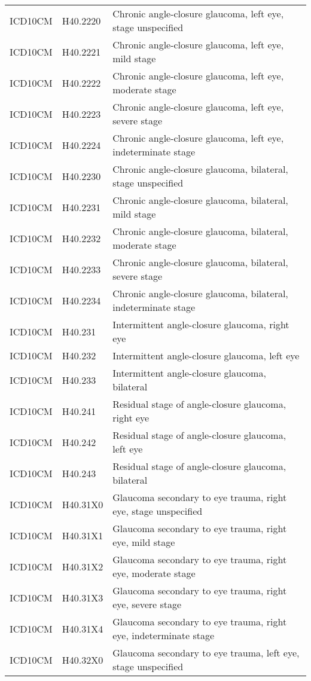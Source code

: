 \begin{longtable}{p{}p{}p{}}
  ICD10CM & H40.2220 & Chronic angle-closure glaucoma, left eye, stage unspecified \\ 
  ICD10CM & H40.2221 & Chronic angle-closure glaucoma, left eye, mild stage \\ 
  ICD10CM & H40.2222 & Chronic angle-closure glaucoma, left eye, moderate stage \\ 
  ICD10CM & H40.2223 & Chronic angle-closure glaucoma, left eye, severe stage \\ 
  ICD10CM & H40.2224 & Chronic angle-closure glaucoma, left eye, indeterminate stage \\ 
  ICD10CM & H40.2230 & Chronic angle-closure glaucoma, bilateral, stage unspecified \\ 
  ICD10CM & H40.2231 & Chronic angle-closure glaucoma, bilateral, mild stage \\ 
  ICD10CM & H40.2232 & Chronic angle-closure glaucoma, bilateral, moderate stage \\ 
  ICD10CM & H40.2233 & Chronic angle-closure glaucoma, bilateral, severe stage \\ 
  ICD10CM & H40.2234 & Chronic angle-closure glaucoma, bilateral, indeterminate stage \\ 
  ICD10CM & H40.231 & Intermittent angle-closure glaucoma, right eye \\ 
  ICD10CM & H40.232 & Intermittent angle-closure glaucoma, left eye \\ 
  ICD10CM & H40.233 & Intermittent angle-closure glaucoma, bilateral \\ 
  ICD10CM & H40.241 & Residual stage of angle-closure glaucoma, right eye \\ 
  ICD10CM & H40.242 & Residual stage of angle-closure glaucoma, left eye \\ 
  ICD10CM & H40.243 & Residual stage of angle-closure glaucoma, bilateral \\ 
  ICD10CM & H40.31X0 & Glaucoma secondary to eye trauma, right eye, stage unspecified \\ 
  ICD10CM & H40.31X1 & Glaucoma secondary to eye trauma, right eye, mild stage \\ 
  ICD10CM & H40.31X2 & Glaucoma secondary to eye trauma, right eye, moderate stage \\ 
  ICD10CM & H40.31X3 & Glaucoma secondary to eye trauma, right eye, severe stage \\ 
  ICD10CM & H40.31X4 & Glaucoma secondary to eye trauma, right eye, indeterminate stage \\ 
  ICD10CM & H40.32X0 & Glaucoma secondary to eye trauma, left eye, stage unspecified \\ 

\end{longtable}
